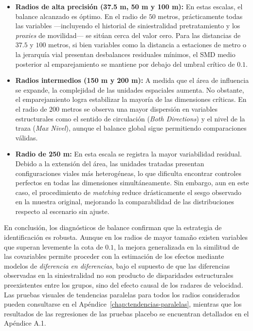 \begin{itemize}
    \item \textbf{Radios de alta precisión (37.5 m, 50 m y 100 m):} En estas escalas, el balance alcanzado es óptimo. En el radio de $50$ metros, prácticamente todas las variables —incluyendo el historial de siniestralidad pretratamiento y los \textit{proxies} de movilidad— se sitúan cerca del valor cero. Para las distancias de $37.5$ y $100$ metros, si bien variables como la distancia a estaciones de metro o la jerarquía vial presentan desbalances residuales mínimos, el SMD medio posterior al emparejamiento se mantiene por debajo del umbral crítico de $0.1$.
    \item \textbf{Radios intermedios (150 m y 200 m):}  A medida que el área de influencia se expande, la complejidad de las unidades espaciales aumenta. No obstante, el emparejamiento logra estabilizar la mayoría de las dimensiones críticas. En el radio de $200$ metros se observa una mayor dispersión en variables estructurales como el sentido de circulación (\textit{Both Directions}) y el nivel de la traza (\textit{Max Nivel}), aunque el balance global sigue permitiendo comparaciones válidas.
    \item \textbf{Radio de 250 m:}  En esta escala se registra la mayor variabilidad residual. Debido a la extensión del área, las unidades tratadas presentan configuraciones viales más heterogéneas, lo que dificulta encontrar controles perfectos en todas las dimensiones simultáneamente. Sin embargo, aun en este caso, el procedimiento de \textit{matching} reduce drásticamente el sesgo observado en la muestra original, mejorando la comparabilidad de las distribuciones respecto al escenario sin ajuste.
\end{itemize}

En conclusión, los diagnósticos de balance confirman que la estrategia de identificación es robusta. Aunque en los radios de mayor tamaño existen variables que superan levemente la cota de $0.1$, la mejora generalizada en la similitud de las covariables permite proceder con la estimación de los efectos mediante modelos de \textit{diferencia en diferencias}, bajo el supuesto de que las diferencias observadas en la siniestralidad no son producto de disparidades estructurales preexistentes entre los grupos, sino del efecto causal de los radares de velocidad. Las pruebas visuales de tendencias paralelas para todos los radios considerados pueden consultarse en el Apéndice~\ref{chap:tendencias-paralelas}, mientras que los resultados de las regresiones de las pruebas placebo se encuentran detallados en el Apéndice A.1.
